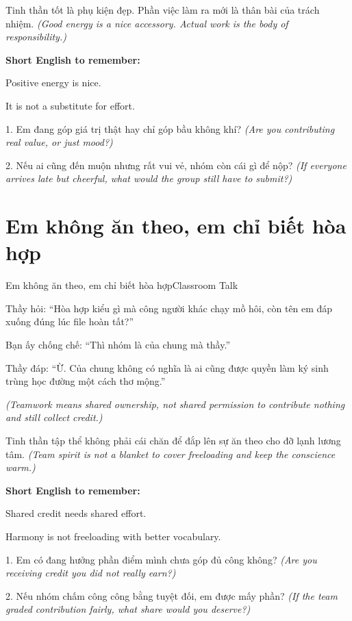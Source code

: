 \begin{baihoc}
Tinh thần tốt là phụ kiện đẹp. Phần việc làm ra mới là thân bài của trách nhiệm.
\textit{(Good energy is a nice accessory. Actual work is the body of responsibility.)}
\end{baihoc}

\begin{ghinhoanh}
\textbf{Short English to remember:}

Positive energy is nice.

It is not a substitute for effort.
\end{ghinhoanh}

\begin{tuhocnhanh}
1. Em đang góp giá trị thật hay chỉ góp bầu không khí? \textit{(Are you contributing real value, or just mood?)}

2. Nếu ai cũng đến muộn nhưng rất vui vẻ, nhóm còn cái gì để nộp? \textit{(If everyone arrives late but cheerful, what would the group still have to submit?)}
\end{tuhocnhanh}
\ngancach

\section{Em không ăn theo, em chỉ biết hòa hợp}
\begin{truyen}{Em không ăn theo, em chỉ biết hòa hợp}{Classroom Talk}

Thầy hỏi: ``Hòa hợp kiểu gì mà công người khác chạy mồ hôi, còn tên em đáp xuống đúng lúc file hoàn tất?''

Bạn ấy chống chế: ``Thì nhóm là của chung mà thầy.''

Thầy đáp: ``Ừ. Của chung không có nghĩa là ai cũng được quyền làm ký sinh trùng học đường một cách thơ mộng.''

\textit{(Teamwork means shared ownership, not shared permission to contribute nothing and still collect credit.)}
\end{truyen}

\begin{baihoc}
Tinh thần tập thể không phải cái chăn để đắp lên sự ăn theo cho đỡ lạnh lương tâm.
\textit{(Team spirit is not a blanket to cover freeloading and keep the conscience warm.)}
\end{baihoc}

\begin{ghinhoanh}
\textbf{Short English to remember:}

Shared credit needs shared effort.

Harmony is not freeloading with better vocabulary.
\end{ghinhoanh}

\begin{tuhocnhanh}
1. Em có đang hưởng phần điểm mình chưa góp đủ công không? \textit{(Are you receiving credit you did not really earn?)}

2. Nếu nhóm chấm công công bằng tuyệt đối, em được mấy phần? \textit{(If the team graded contribution fairly, what share would you deserve?)}
\end{tuhocnhanh}
\ngancach